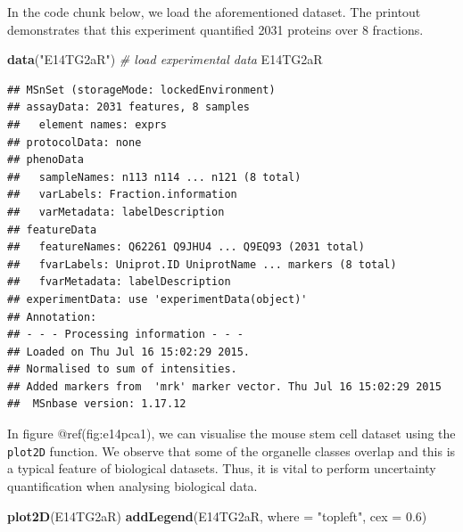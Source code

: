 \documentclass[
]{article}
\newenvironment{Shaded}{\begin{snugshade}}{\end{snugshade}}
\newcommand{\CommentTok}[1]{\textcolor[rgb]{0.56,0.35,0.01}{\textit{#1}}}
\newcommand{\DataTypeTok}[1]{\textcolor[rgb]{0.13,0.29,0.53}{#1}}
\newcommand{\FloatTok}[1]{\textcolor[rgb]{0.00,0.00,0.81}{#1}}
\newcommand{\KeywordTok}[1]{\textcolor[rgb]{0.13,0.29,0.53}{\textbf{#1}}}
\newcommand{\NormalTok}[1]{#1}
\newcommand{\StringTok}[1]{\textcolor[rgb]{0.31,0.60,0.02}{#1}}
\begin{document}
In the code chunk below, we load the aforementioned dataset. The
printout demonstrates that this experiment quantified 2031 proteins over
8 fractions.

\begin{Shaded}
\begin{Highlighting}[]
\KeywordTok{data}\NormalTok{(}\StringTok{"E14TG2aR"}\NormalTok{) }\CommentTok{# load experimental data}
\NormalTok{E14TG2aR}
\end{Highlighting}
\end{Shaded}

\begin{verbatim}
## MSnSet (storageMode: lockedEnvironment)
## assayData: 2031 features, 8 samples 
##   element names: exprs 
## protocolData: none
## phenoData
##   sampleNames: n113 n114 ... n121 (8 total)
##   varLabels: Fraction.information
##   varMetadata: labelDescription
## featureData
##   featureNames: Q62261 Q9JHU4 ... Q9EQ93 (2031 total)
##   fvarLabels: Uniprot.ID UniprotName ... markers (8 total)
##   fvarMetadata: labelDescription
## experimentData: use 'experimentData(object)'
## Annotation:  
## - - - Processing information - - -
## Loaded on Thu Jul 16 15:02:29 2015. 
## Normalised to sum of intensities. 
## Added markers from  'mrk' marker vector. Thu Jul 16 15:02:29 2015 
##  MSnbase version: 1.17.12
\end{verbatim}

In figure @ref(fig:e14pca1), we can visualise the mouse stem cell
dataset using the \texttt{plot2D} function. We observe that some of the
organelle classes overlap and this is a typical feature of biological
datasets. Thus, it is vital to perform uncertainty quantification when
analysing biological data.

\begin{Shaded}
\begin{Highlighting}[]
\KeywordTok{plot2D}\NormalTok{(E14TG2aR)}
\KeywordTok{addLegend}\NormalTok{(E14TG2aR, }\DataTypeTok{where =} \StringTok{"topleft"}\NormalTok{, }\DataTypeTok{cex =} \FloatTok{0.6}\NormalTok{)}
\end{Highlighting}
\end{Shaded}
\end{document}
